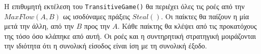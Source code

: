 \begin{proofsketch}
  Η επιθυμητή εκτέλεση του \texttt{\textlatin{TransitiveGame}()} θα περιέχει όλες τις ροές από την $MaxFlow\left(A, B\right)$
  ως ισοδύναμες πράξεις $Steal\left(\right)$. Οι παίκτες θα παίζουν η μία μετά την άλλη, από την $B$ προς την $A$. Κάθε
  παίκτης θα κλέψει από τις προκατόχους της τόσο όσο κλάπηκε από αυτή. Οι ροές και η συντηρητική στρατηγική μοιράζονται την
  ιδιότητα ότι η συνολική είσοδος είναι ίση με τη συνολική έξοδο.
\end{proofsketch}
